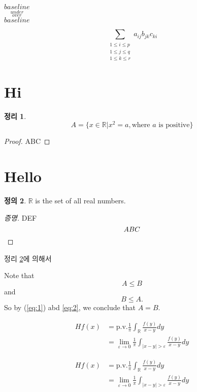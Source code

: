 \documentclass[footnote]{oblivoir}
\theoremstyle{definition}
\newtheorem{thm}{정리}[section]
\newtheorem{defn}[thm]{정의}
\begin{document}
$\underset{under}{baseline}$ \\

$\overset{over}{baseline}$

\[
\sum_{\substack{1\leq i\leq p \\
1 \leq j \leq q \\
1 \leq k \leq r}}
a_{ij} b_{jk} c_{ki}
\]

\section{Hi}
\begin{thm}
\[ A=\{ x \in \mathbb{R} | x^2=a, \text{where $a$ is positive}\}\]
\end{thm}
\begin{proof}
ABC
\end{proof}

\section{Hello}
\begin{defn} \label{thm:1}
$\mathbb{R}$ is the set of all real numbers.
\end{defn}
\begin{proof}[증명]
DEF
\[ ABC \qedhere \]
\end{proof}

정리 \ref{thm:1}에 의해서

Note that
\begin{equation} \label{eq:1}
A \leq B
\end{equation}
and
\begin{equation} \label{eq:2}
B \leq A.
\end{equation}
So by (\ref{eq:1}) abd \eqref{eq:2}, we conclude that $A=B$.

\begin{equation}
\begin{split}
Hf(x)&=\mathrm{p.v.}\frac{1}{\pi}\int_{\mathbb{R}} \frac{f(y)}{x-y}dy\\
&=\lim_{\varepsilon \rightarrow 0}\frac{1}{\pi} \int_{|x-y|>\varepsilon}\frac{f(y)}{x-y}dy
\end{split}
\end{equation}

\begin{equation}
\begin{aligned}
Hf(x)&=\mathrm{p.v.}\frac{1}{\pi}\int_{\mathbb{R}} \frac{f(y)}{x-y}dy\\
&=\lim_{\varepsilon \rightarrow 0}\frac{1}{\pi} \int_{|x-y|>\varepsilon}\frac{f(y)}{x-y}dy
\end{aligned}
\end{equation}
\end{document}
